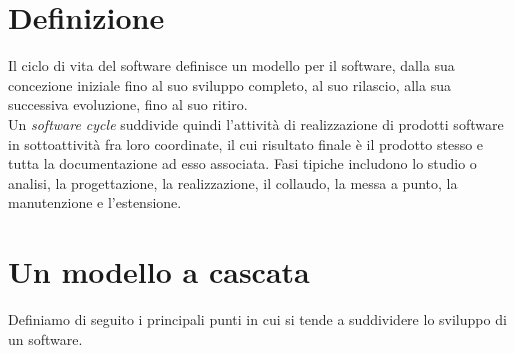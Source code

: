 \section{Definizione}
Il ciclo di vita del software definisce un modello per il software, dalla sua concezione iniziale fino al suo sviluppo completo, al suo rilascio, alla sua successiva evoluzione, fino al suo ritiro. \\
Un \textit{software cycle} suddivide quindi l'attività di realizzazione di prodotti software in sottoattività fra loro coordinate, il cui risultato finale è il prodotto stesso e tutta la documentazione ad esso associata. Fasi tipiche includono lo studio o analisi, la progettazione, la realizzazione, il collaudo, la messa a punto, la manutenzione e l'estensione.
\section{Un modello a cascata}
Definiamo di seguito i principali punti in cui si tende a suddividere lo sviluppo di un software.
